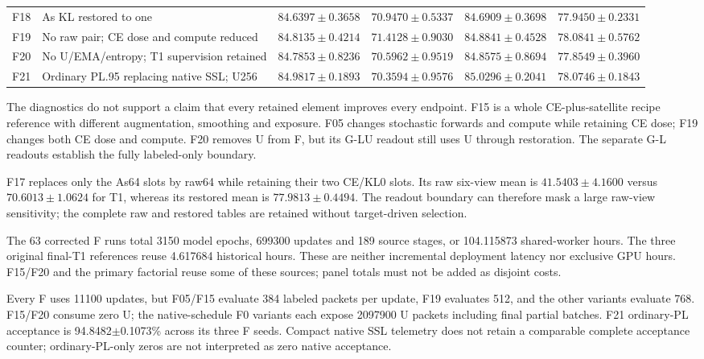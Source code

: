 \begin{table}[t]
\begin{tabular}{lp{}rrrr}
F18 & As KL restored to one & $84.6397\pm0.3658$ & $70.9470\pm0.5337$ & $84.6909\pm0.3698$ & $77.9450\pm0.2331$ \\

F19 & No raw pair; CE dose and compute reduced & $84.8135\pm0.4214$ & $71.4128\pm0.9030$ & $84.8841\pm0.4528$ & $78.0841\pm0.5762$ \\

F20 & No U/EMA/entropy; T1 supervision retained & $84.7853\pm0.8236$ & $70.5962\pm0.9519$ & $84.8575\pm0.8694$ & $77.8549\pm0.3960$ \\

F21 & Ordinary PL.95 replacing native SSL; U256 & $84.9817\pm0.1893$ & $70.3594\pm0.9576$ & $85.0296\pm0.2041$ & $78.0746\pm0.1843$ \\

\bottomrule

\end{tabular}

\end{table}

The diagnostics do not support a claim that every retained element improves every endpoint. F15 is a whole CE-plus-satellite recipe reference with different augmentation, smoothing and exposure. F05 changes stochastic forwards and compute while retaining CE dose; F19 changes both CE dose and compute. F20 removes U from F, but its G-LU readout still uses U through restoration. The separate G-L readouts establish the fully labeled-only boundary.

F17 replaces only the As64 slots by raw64 while retaining their two CE/KL0 slots. Its raw six-view mean is $41.5403\pm4.1600$ versus $70.6013\pm1.0624$ for T1, whereas its restored mean is $77.9813\pm0.4494$. The readout boundary can therefore mask a large raw-view sensitivity; the complete raw and restored tables are retained without target-driven selection.

The 63 corrected F runs total 3150 model epochs, 699300 updates and 189 source stages, or 104.115873 shared-worker hours. The three original final-T1 references reuse 4.617684 historical hours. These are neither incremental deployment latency nor exclusive GPU hours. F15/F20 and the primary factorial reuse some of these sources; panel totals must not be added as disjoint costs.

Every F uses 11100 updates, but F05/F15 evaluate 384 labeled packets per update, F19 evaluates 512, and the other variants evaluate 768. F15/F20 consume zero U; the native-schedule F0 variants each expose 2097900 U packets including final partial batches. F21 ordinary-PL acceptance is 94.8482$\pm$0.1073\% across its three F seeds. Compact native SSL telemetry does not retain a comparable complete acceptance counter; ordinary-PL-only zeros are not interpreted as zero native acceptance.

